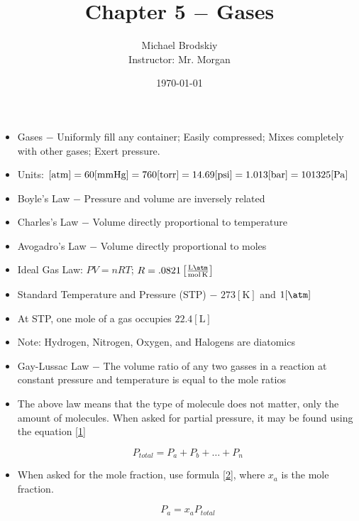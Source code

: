 \documentclass[12pt]{article}
\title{Chapter 5 $-$ Gases}
\date{\today}
\author{Michael Brodskiy\\ \small Instructor: Mr. Morgan}
\begin{document}
\maketitle

\begin{itemize}

  \item Gases $-$ Uniformly fill any container; Easily compressed; Mixes completely with other gases; Exert pressure.

  \item Units: $[\si{atm}]=60[\si{\milli\meter}\ce{Hg}]=760[\si{torr}]=14.69[\si{psi}]=1.013[\si{bar}]=101325[\si{\pascal}]$

  \item Boyle's Law $-$ Pressure and volume are inversely related

  \item Charles's Law $-$ Volume directly proportional to temperature

  \item Avogadro's Law $-$ Volume directly proportional to moles

  \item Ideal Gas Law: $PV=nRT$; $R=.0821\left[ \frac{\si{\liter\atm}}{\si{\mole\kelvin}} \right]$

  \item Standard Temperature and Pressure (STP) $-$ $273[\si{\kelvin}]$ and $1[\si{\atm}]$

  \item At STP, one mole of a gas occupies $22.4[\si{\liter}]$

  \item Note: Hydrogen, Nitrogen, Oxygen, and Halogens are diatomics


  \item Gay-Lussac Law $-$ The volume ratio of any two gasses in a reaction at constant pressure and temperature is equal to the mole ratios

  \item The above law means that the type of molecule does not matter, only the amount of molecules. When asked for partial pressure, it may be found using the equation \eqref{1}

    \begin{equation}
      P_{total}=P_a+P_b+\dots+P_n
      \label{1}
    \end{equation}

  \item When asked for the mole fraction, use formula \eqref{2}, where $x_a$ is the mole fraction.

    \begin{equation}
      P_a=x_aP_{total}
      \label{2}
    \end{equation}
    
\end{itemize}
\end{document}
